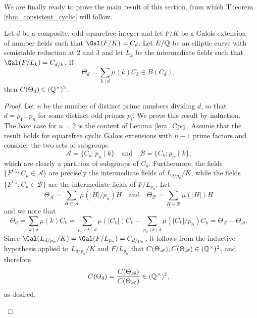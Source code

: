 We are finally ready to prove the main result of this section, from which Theorem \ref{thm_consistent_cyclic} will follow. 

\begin{lemma}\label{lem_Cd_odd}
    Let $d$ be a composite, odd squarefree integer and let $F/K$ be a Galois extension of number fields such that $\Gal(F/K)=C_{d}$. Let $E/\mathbb{Q}$ be an elliptic curve with semistable reduction at $2$ and $3$ and let $L_k$ be the intermediate fields such that $\Gal(F/L_k)=C_{d/k}$. If 
    $$\Theta_d=\sum_{k\mid d}\mu(k)C_k\in B(C_d),$$
    then $C(\Theta_d)\in(\mathbb{Q}^{\times})^2$.
\end{lemma}

\begin{proof}
    Let $n$ be the number of distinct prime numbers dividing $d$, so that $d=p_1\ldots p_n$ for some distinct odd primes $p_i$. We prove this result by induction. The base case for $n=2$ is the content of Lemma \ref{lem_Cpq}. Assume that the result holds for squarefree cyclic Galois extensions with $n-1$ prime factors and consider the two sets of subgroups
    $$\mathcal{A}=\{C_k:p_n\mid k\}\quad\text{and}\quad\mathcal{B}=\{C_k:p_n\nmid k\},$$
    which are clearly a partition of subgroups of $C_d$. Furthermore, the fields $\{F^{C_k}:C_k\in\mathcal{A}\}$ are precisely the intermediate fields of $L_{d/p_n}/K$, while the fields $\{F^{C_k}:C_k\in\mathcal{B}\}$ are the intermediate fields of $F/L_{p_n}$.
    Let 
    $$\Theta_\mathcal{A}=\sum_{H\in\mathcal{A}}\mu(|H|/p_n)H\quad\text{and}\quad\Theta_\mathcal{B}=\sum_{H\in\mathcal{B}}\mu(|H|)H$$
    and we note that
    \begin{equation}\label{eqn_theta}
        \Theta_d=\sum_{k\mid d}\mu(k)C_k=\sum_{p_n\nmid k\mid d}\mu(|C_k|)C_k-\sum_{p_n\mid k\mid d}\mu(|C_k|/p_n)C_k=\Theta_\mathcal{B}-\Theta_\mathcal{A}.
    \end{equation}
    Since $\Gal(L_{d/p_n}/K)=\Gal(F/L_{p_n})=C_{d/p_n}$, it follows from the inductive hypothesis applied to $L_{d/p_n}/K$ and $F/L_{p_n}$ that $C(\Theta_\mathcal{A}),C(\Theta_\mathcal{B})\in(\mathbb{Q}^{\times})^2$, and therefore
    $$C(\Theta_d)=\frac{C(\Theta_\mathcal{B})}{C(\Theta_\mathcal{A})}\in(\mathbb{Q}^{\times})^2,$$ 
    as desired.
    \begin{figure}[!ht]
        \centering
\end{figure}
\end{proof}
